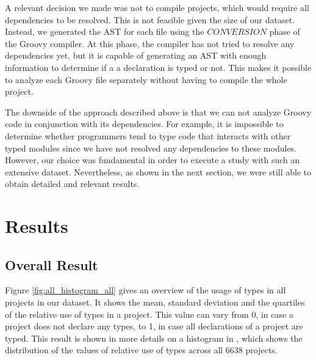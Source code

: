 \documentclass[preprint]{sigplanconf}
\begin{document}
A relevant decision we made was not to compile projects, which would require all dependencies to be resolved.
This is not feasible given the size of our dataset.
Instead, we generated the AST for each file using the $CONVERSION$ phase of the Groovy compiler.
At this phase, the compiler has not tried to resolve any dependencies yet, but it is capable of generating an AST with enough information to determine if a a declaration is typed or not.
This makes it possible to analyze each Groovy file separately without having to compile the whole project.

The downside of the approach described above is that we can not analyze Groovy code in conjunction with its dependencies. 
For example, it is impossible to determine whether programmers tend to type code that interacts with other typed modules since we have not resolved any dependencies to these modules.
However, our choice was fundamental in order to execute a study with such an extensive dataset.
Nevertheless, as shown in the next section, we were still able to obtain detailed and relevant results.











%
%
\section{Results\label{results}}

\subsection{Overall Result\label{res-overall}}
Figure \ref{fig:all_histogram_all} gives an overview of the usage of types in all projects in our dataset.
It shows the mean, standard deviation and the quartiles of the relative use of types in a project. 
This value can vary from 0, in case a project does not declare any types, to 1, in case all declarations of a project are typed. 
This result is shown in more details on a histogram in , which shows the distribution of the values of relative use of types across all 6638 projects.
\end{document}
